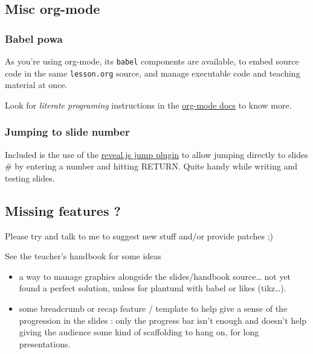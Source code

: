 \documentclass[a4paper]{article}
\newenvironment{NOTES}{\begin{lrbox}{\mybox}\begin{minipage}{0.9\textwidth}\begin{shaded}}{\end{shaded}\end{minipage}\end{lrbox}\fbox{\usebox{\mybox}}}
\begin{document}
\subsection{Misc org-mode}
\label{sec:orgc856fe5}

\subsubsection{Babel powa}
\label{sec:orgedd1b66}
As you're using org-mode, its \texttt{babel} components are available, to embed source code in the same \texttt{lesson.org} source, and manage executable code and teaching material at once.

Look for \emph{literate programing} instructions in the \href{http://orgmode.org/manual/Working-with-source-code.html}{org-mode docs} to know more.

\subsubsection{Jumping to slide number}
\label{sec:org81e9d97}

Included is the use of the
\href{https://github.com/SethosII/reveal.js-jump-plugin}{reveal.js jump
plugin} to allow jumping directly to slides \# by entering a number
and hitting RETURN. Quite handy while writing and testing slides.

\subsection{Missing features ?}
\label{sec:org120685b}

Please try and talk to me to suggest new stuff and/or provide patches ;)

\begin{NOTES}
See the teacher's handbook for some ideas

\begin{itemize}
\item a way to manage graphics alongside the slides/handbook source\ldots{} not yet found a perfect solution, unless for plantuml with babel or likes (tikz\ldots{}).

\item some breadcrumb or recap feature / template to help give a sense of
the progression in the slides : only the progress bar isn't enough
and doesn't help giving the audience some kind of scaffolding to
hang on, for long presentations.
\end{itemize}
\end{NOTES}
\end{document}
